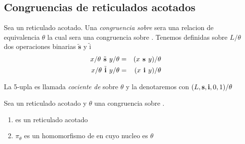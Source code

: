   \subsection{Congruencias de reticulados acotados}
  \begin{definition}
    Sea \reticulAcot un reticulado acotado. Una \emph{congruencia sobre} \reticulAcot sera una
    relacion de equivalencia $\theta$ la cual sera una congruencia sobre \reticulAlg. Tenemos definidas sobre
    $L/\theta$ dos operaciones binarias $\tilde{\textbf{s}}$ y $\tilde{\text{i}}$
    \begin{alignat*}{2}
      x/\theta\tilde{\textbf{ s }}y/\theta &=& (x\textbf{ s }y)/\theta\\
      x/\theta\tilde{\textbf{ i }}y/\theta &=& (x\textbf{ i }y)/\theta
    \end{alignat*}

    La 5-upla  es llamada
    \emph{cociente de} \reticulAcot sobre $\theta$ y la denotaremos con $(L, \textbf{s}, \textbf{i}, 0, 1)/\theta$
  \end{definition}

  \begin{lemma}
    Sea \reticulAcot un reticulado acotado y $\theta$ una congruencia sobre \reticulAcot.
    \begin{enumerate}
      \item {} es un reticulado acotado
      \item $\pi_\theta$ es un homomorfismo de \reticulAcot en  cuyo nucleo es $\theta$
    \end{enumerate}
  \end{lemma}

